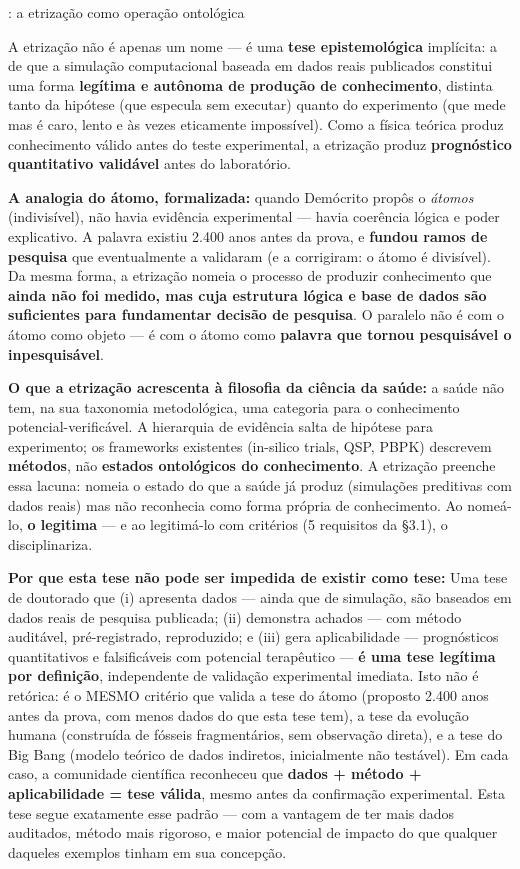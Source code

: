 \documentclass[
  10pt,
]{article}
\begin{document}
: a etrização como operação ontológica

A etrização não é apenas um nome --- é uma \textbf{tese epistemológica}
implícita: a de que a simulação computacional baseada em dados reais
publicados constitui uma forma \textbf{legítima e autônoma de produção
de conhecimento}, distinta tanto da hipótese (que especula sem executar)
quanto do experimento (que mede mas é caro, lento e às vezes eticamente
impossível). Como a física teórica produz conhecimento válido antes do
teste experimental, a etrização produz \textbf{prognóstico quantitativo
validável} antes do laboratório.

\textbf{A analogia do átomo, formalizada:} quando Demócrito propôs o
\emph{átomos} (indivisível), não havia evidência experimental --- havia
coerência lógica e poder explicativo. A palavra existiu 2.400 anos antes
da prova, e \textbf{fundou ramos de pesquisa} que eventualmente a
validaram (e a corrigiram: o átomo é divisível). Da mesma forma, a
etrização nomeia o processo de produzir conhecimento que \textbf{ainda
não foi medido, mas cuja estrutura lógica e base de dados são
suficientes para fundamentar decisão de pesquisa}. O paralelo não é com
o átomo como objeto --- é com o átomo como \textbf{palavra que tornou
pesquisável o inpesquisável}.

\textbf{O que a etrização acrescenta à filosofia da ciência da saúde:} a
saúde não tem, na sua taxonomia metodológica, uma categoria para o
conhecimento potencial-verificável. A hierarquia de evidência salta de
hipótese para experimento; os frameworks existentes (in-silico trials,
QSP, PBPK) descrevem \textbf{métodos}, não \textbf{estados ontológicos
do conhecimento}. A etrização preenche essa lacuna: nomeia o estado do
que a saúde já produz (simulações preditivas com dados reais) mas não
reconhecia como forma própria de conhecimento. Ao nomeá-lo, \textbf{o
legitima} --- e ao legitimá-lo com critérios (5 requisitos da §3.1), o
disciplinariza.

\textbf{Por que esta tese não pode ser impedida de existir como tese:}
Uma tese de doutorado que (i) apresenta dados --- ainda que de
simulação, são baseados em dados reais de pesquisa publicada; (ii)
demonstra achados --- com método auditável, pré-registrado, reproduzido;
e (iii) gera aplicabilidade --- prognósticos quantitativos e
falsificáveis com potencial terapêutico --- \textbf{é uma tese legítima
por definição}, independente de validação experimental imediata. Isto
não é retórica: é o MESMO critério que valida a tese do átomo (proposto
2.400 anos antes da prova, com menos dados do que esta tese tem), a tese
da evolução humana (construída de fósseis fragmentários, sem observação
direta), e a tese do Big Bang (modelo teórico de dados indiretos,
inicialmente não testável). Em cada caso, a comunidade científica
reconheceu que \textbf{dados + método + aplicabilidade = tese válida},
mesmo antes da confirmação experimental. Esta tese segue exatamente esse
padrão --- com a vantagem de ter mais dados auditados, método mais
rigoroso, e maior potencial de impacto do que qualquer daqueles exemplos
tinham em sua concepção.
\end{document}
